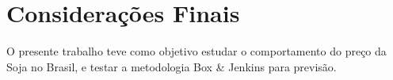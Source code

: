 \documentclass[
	12pt,				%
	openright,			%
	oneside,      %
	a4paper,			%
	english,			%
	french,				%
	spanish,			%
	brazil,				%
	]{abntex2}\usepackage[]{graphicx}\usepackage[table]{xcolor}
\theoremstyle{definition}
\theoremstyle{remark}
\begin{document}
\chapter{Considerações Finais}

O presente trabalho teve como objetivo estudar o comportamento do preço da Soja no Brasil, e testar a metodologia Box \& Jenkins para previsão.





%
%



\end{document}

